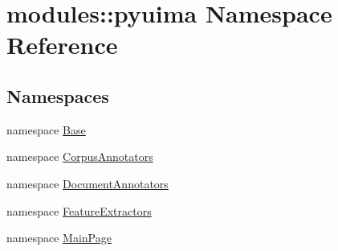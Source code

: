 \hypertarget{namespacemodules_1_1pyuima}{\section{modules\-:\-:pyuima \-Namespace \-Reference}
\label{namespacemodules_1_1pyuima}
}
\subsection*{\-Namespaces}
\begin{DoxyCompactItemize}
\item 
namespace \hyperlink{namespacemodules_1_1pyuima_1_1Base}{\-Base}
\item 
namespace \hyperlink{namespacemodules_1_1pyuima_1_1CorpusAnnotators}{\-Corpus\-Annotators}
\item 
namespace \hyperlink{namespacemodules_1_1pyuima_1_1DocumentAnnotators}{\-Document\-Annotators}
\item 
namespace \hyperlink{namespacemodules_1_1pyuima_1_1FeatureExtractors}{\-Feature\-Extractors}
\item 
namespace \hyperlink{namespacemodules_1_1pyuima_1_1MainPage}{\-Main\-Page}
\end{DoxyCompactItemize}
